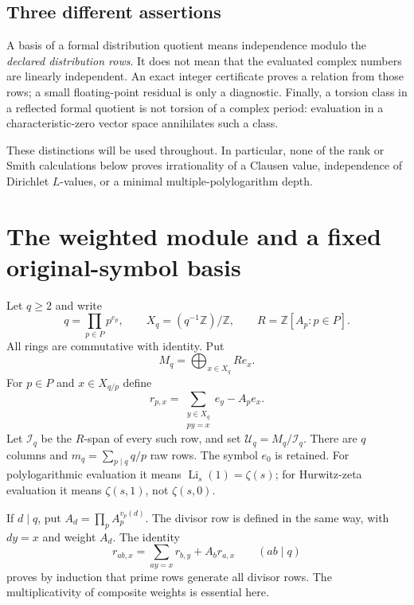 \documentclass[11pt]{article}
\numberwithin{equation}{section}
\theoremstyle{definition}
\theoremstyle{remark}
\DeclareMathOperator{\Li}{Li}
\newcommand{\Z}{\mathbb Z}
\newcommand{\U}{\mathcal U}
\newcommand{\I}{\mathcal I}
\begin{document}
\subsection{Three different assertions}
A basis of a formal distribution quotient means independence modulo the
\emph{declared distribution rows}. It does not mean that the evaluated
complex numbers are linearly independent. An exact integer certificate
proves a relation from those rows; a small floating-point residual is
only a diagnostic. Finally, a torsion class in a reflected formal
quotient is not torsion of a complex period: evaluation in a
characteristic-zero vector space annihilates such a class.

These distinctions will be used throughout. In particular, none of the
rank or Smith calculations below proves irrationality of a Clausen value,
independence of Dirichlet $L$-values, or a minimal multiple-polylogarithm
depth.

\section{The weighted module and a fixed original-symbol basis}
\label{sec:presentation}
Let $q\ge2$ and write
\[
 q=\prod_{p\in P}p^{e_p},\qquad
 X_q=(q^{-1}\Z)/\Z,\qquad R=\Z[A_p:p\in P].
\]
All rings are commutative with identity. Put
\[
 M_q=\bigoplus_{x\in X_q}Re_x.
\]
For $p\in P$ and $x\in X_{q/p}$ define
\begin{equation}
 r_{p,x}=\sum_{\substack{y\in X_q\\py=x}}e_y-A_pe_x.
 \label{eq:raw}
\end{equation}
Let $\I_q$ be the $R$-span of every such row, and set
$\U_q=M_q/\I_q$. There are $q$ columns and
$m_q=\sum_{p\mid q}q/p$ raw rows. The symbol $e_0$ is retained.
For polylogarithmic evaluation it means $\Li_s(1)=\zeta(s)$;
for Hurwitz-zeta evaluation it means $\zeta(s,1)$, not $\zeta(s,0)$.

If $d\mid q$, put $A_d=\prod_p A_p^{v_p(d)}$.
The divisor row is defined in the same way, with $dy=x$ and weight $A_d$.
The identity
\begin{equation}
 r_{ab,x}=\sum_{ay=x}r_{b,y}+A_b r_{a,x}\qquad(ab\mid q)
 \label{eq:composite}
\end{equation}
proves by induction that prime rows generate all divisor rows. The
multiplicativity of composite weights is essential here.
\end{document}
